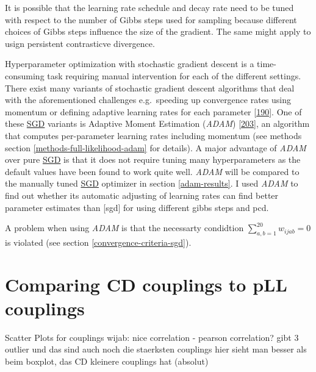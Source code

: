 \documentclass[11pt,a4paper,twoside]{book}
\newcommand{\wijab}{w_{ijab}}
\theoremstyle{definition}
\theoremstyle{definition}
\theoremstyle{remark}
\begin{document}
It is possible that the learning rate schedule and decay rate need to be
tuned with respect to the number of Gibbs steps used for sampling
because different choices of Gibbs steps influence the size of the
gradient. The same might apply to usign persistent contrasticve
divergence.

Hyperparameter optimization with stochastic gradient descent is a
time-consuming task requiring manual intervention for each of the
different settings. There exist many variants of stochastic gradient
descent algorithms that deal with the aforementioned challenges
e.g.~speeding up convergence rates using momentum or defining adaptive
learning rates for each parameter
{[}\protect\hyperlink{ref-Ruder2017}{190}{]}. One of these
\protect\hyperlink{abbrev}{SGD} variants is Adaptive Moment Estimation
(\emph{ADAM}) {[}\protect\hyperlink{ref-Kingma2014}{203}{]}, an
algorithm that computes per-parameter learning rates including momentum
(see methods section \ref{methods-full-likelihood-adam} for details). A
major advantage of \emph{ADAM} over pure \protect\hyperlink{abbrev}{SGD}
is that it does not require tuning many hyperparameters as the default
values have been found to work quite well. \emph{ADAM} will be compared
to the manually tuned \protect\hyperlink{abbrev}{SGD} optimizer in
section \ref{adam-results}. I used \emph{ADAM} to find out whether its
automatic adjusting of learning rates can find better parameter
estimates than {[}sgd{]} for using different gibbs steps and pcd.

A problem when using \emph{ADAM} is that the necessarty condidtion
\(\sum_{a,b=1}^{20} \wijab = 0\) is violated (see section
\ref{convergence-criteria-sgd}).

\section{Comparing CD couplings to pLL
couplings}\label{comparing-pll-cd}

Scatter Plots for couplings wijab: nice correlation - pearson
correlation? gibt 3 outlier und das sind auch noch die staerksten
couplings hier sieht man besser als beim boxplot, das CD kleinere
couplings hat (absolut)
\end{document}
